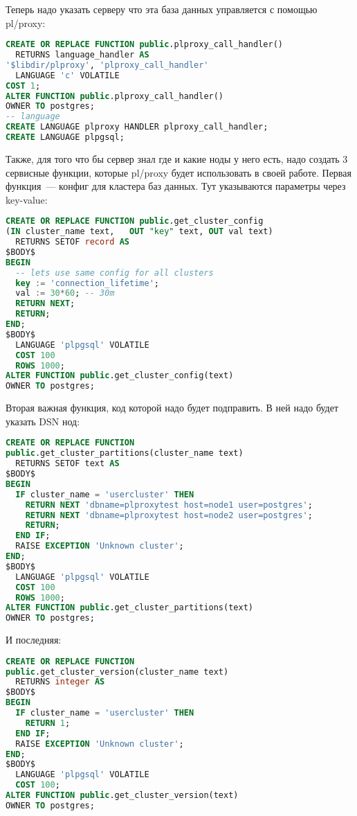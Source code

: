 Теперь надо указать серверу что эта база данных управляется с помощью pl/proxy:
\begin{lstlisting}[language=SQL,label=lst:plproxy6,caption=Настройка]
CREATE OR REPLACE FUNCTION public.plproxy_call_handler()
  RETURNS language_handler AS
'$libdir/plproxy', 'plproxy_call_handler'
  LANGUAGE 'c' VOLATILE
COST 1;
ALTER FUNCTION public.plproxy_call_handler() 
OWNER TO postgres;
-- language
CREATE LANGUAGE plproxy HANDLER plproxy_call_handler;
CREATE LANGUAGE plpgsql;
\end{lstlisting}

Также, для того что бы сервер знал где и какие ноды у него есть, надо создать 3 сервисные функции, которые pl/proxy будет использовать в своей работе. Первая функция~--- конфиг для кластера баз данных. Тут указываются параметры через key-value:
\begin{lstlisting}[language=SQL,label=lst:plproxy7,caption=Настройка]
CREATE OR REPLACE FUNCTION public.get_cluster_config
(IN cluster_name text,   OUT "key" text, OUT val text)
  RETURNS SETOF record AS
$BODY$
BEGIN
  -- lets use same config for all clusters
  key := 'connection_lifetime';
  val := 30*60; -- 30m
  RETURN NEXT;
  RETURN;
END;
$BODY$
  LANGUAGE 'plpgsql' VOLATILE
  COST 100
  ROWS 1000;
ALTER FUNCTION public.get_cluster_config(text) 
OWNER TO postgres;  
\end{lstlisting}

Вторая важная функция, код которой надо будет подправить. В ней надо будет указать DSN нод:
\begin{lstlisting}[language=SQL,label=lst:plproxy8,caption=Настройка]
CREATE OR REPLACE FUNCTION 
public.get_cluster_partitions(cluster_name text)
  RETURNS SETOF text AS
$BODY$
BEGIN
  IF cluster_name = 'usercluster' THEN
    RETURN NEXT 'dbname=plproxytest host=node1 user=postgres';
    RETURN NEXT 'dbname=plproxytest host=node2 user=postgres';
    RETURN;
  END IF;
  RAISE EXCEPTION 'Unknown cluster';
END;
$BODY$
  LANGUAGE 'plpgsql' VOLATILE
  COST 100
  ROWS 1000;
ALTER FUNCTION public.get_cluster_partitions(text) 
OWNER TO postgres;
\end{lstlisting}

И последняя:
\begin{lstlisting}[language=SQL,label=lst:plproxy9,caption=Настройка]
CREATE OR REPLACE FUNCTION 
public.get_cluster_version(cluster_name text)
  RETURNS integer AS
$BODY$
BEGIN
  IF cluster_name = 'usercluster' THEN
    RETURN 1;
  END IF;
  RAISE EXCEPTION 'Unknown cluster';
END;
$BODY$
  LANGUAGE 'plpgsql' VOLATILE
  COST 100;
ALTER FUNCTION public.get_cluster_version(text) 
OWNER TO postgres;
\end{lstlisting}

